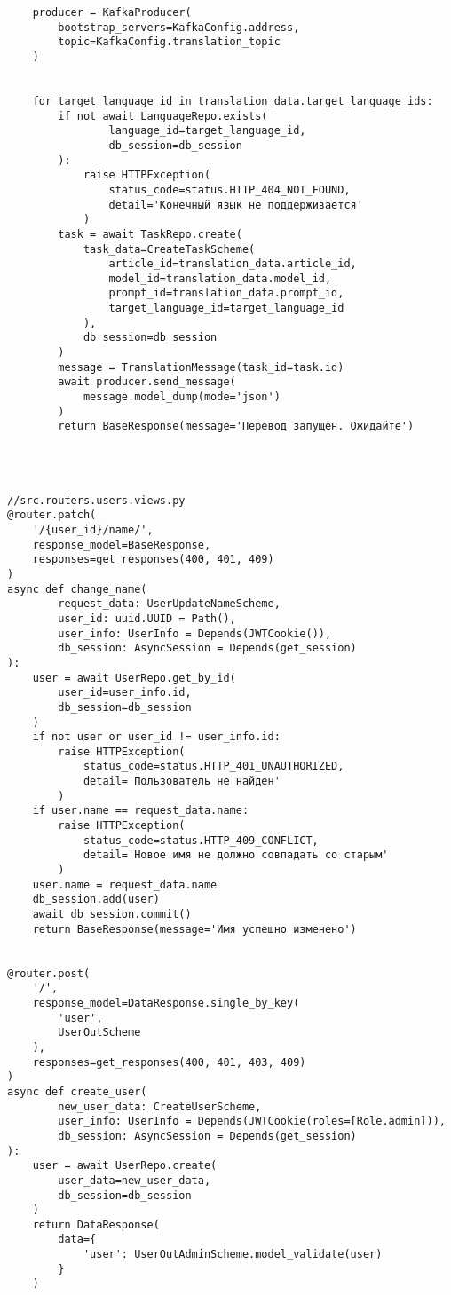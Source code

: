 \begin{lstlisting}
    producer = KafkaProducer(
        bootstrap_servers=KafkaConfig.address,
        topic=KafkaConfig.translation_topic
    )


    for target_language_id in translation_data.target_language_ids:
        if not await LanguageRepo.exists(
                language_id=target_language_id,
                db_session=db_session
        ):
            raise HTTPException(
                status_code=status.HTTP_404_NOT_FOUND,
                detail='Конечный язык не поддерживается'
            )
        task = await TaskRepo.create(
            task_data=CreateTaskScheme(
                article_id=translation_data.article_id,
                model_id=translation_data.model_id,
                prompt_id=translation_data.prompt_id,
                target_language_id=target_language_id
            ),
            db_session=db_session
        )
        message = TranslationMessage(task_id=task.id)
        await producer.send_message(
            message.model_dump(mode='json')
        )
        return BaseResponse(message='Перевод запущен. Ожидайте')




//src.routers.users.views.py
@router.patch(
    '/{user_id}/name/',
    response_model=BaseResponse,
    responses=get_responses(400, 401, 409)
)
async def change_name(
        request_data: UserUpdateNameScheme,
        user_id: uuid.UUID = Path(),
        user_info: UserInfo = Depends(JWTCookie()),
        db_session: AsyncSession = Depends(get_session)
):
    user = await UserRepo.get_by_id(
        user_id=user_info.id,
        db_session=db_session
    )
    if not user or user_id != user_info.id:
        raise HTTPException(
            status_code=status.HTTP_401_UNAUTHORIZED,
            detail='Пользователь не найден'
        )
    if user.name == request_data.name:
        raise HTTPException(
            status_code=status.HTTP_409_CONFLICT,
            detail='Новое имя не должно совпадать со старым'
        )
    user.name = request_data.name
    db_session.add(user)
    await db_session.commit()
    return BaseResponse(message='Имя успешно изменено')


@router.post(
    '/',
    response_model=DataResponse.single_by_key(
        'user',
        UserOutScheme
    ),
    responses=get_responses(400, 401, 403, 409)
)
async def create_user(
        new_user_data: CreateUserScheme,
        user_info: UserInfo = Depends(JWTCookie(roles=[Role.admin])),
        db_session: AsyncSession = Depends(get_session)
):
    user = await UserRepo.create(
        user_data=new_user_data,
        db_session=db_session
    )
    return DataResponse(
        data={
            'user': UserOutAdminScheme.model_validate(user)
        }
    )



\end{lstlisting}
